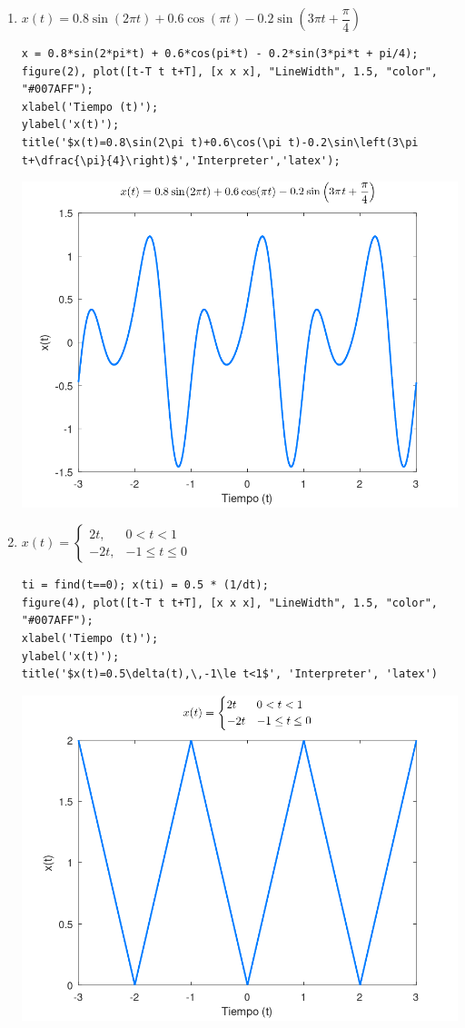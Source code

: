 \documentclass{article}
\begin{document}
\begin{enumerate}[leftmargin=*]
\begin{enumerate}[label=\alph*)]
\item $x(t)=0.8\sin(2\pi t)+0.6\cos(\pi t)-0.2\sin\left(3\pi t+\dfrac{\pi}{4}\right)$
\begin{lstlisting}
x = 0.8*sin(2*pi*t) + 0.6*cos(pi*t) - 0.2*sin(3*pi*t + pi/4);
figure(2), plot([t-T t t+T], [x x x], "LineWidth", 1.5, "color", "#007AFF");
xlabel('Tiempo (t)');
ylabel('x(t)');
title('$x(t)=0.8\sin(2\pi t)+0.6\cos(\pi t)-0.2\sin\left(3\pi t+\dfrac{\pi}{4}\right)$','Interpreter','latex');
\end{lstlisting}
\begin{center}
\includegraphics[width=0.7\linewidth]{Imágenes/Figura2}
\end{center}
\item $x(t)=\begin{cases}
2t, & 0<t<1\\
-2t,&-1\le t\le0
\end{cases}$
\begin{lstlisting}
ti = find(t==0); x(ti) = 0.5 * (1/dt);
figure(4), plot([t-T t t+T], [x x x], "LineWidth", 1.5, "color", "#007AFF");
xlabel('Tiempo (t)');
ylabel('x(t)');
title('$x(t)=0.5\delta(t),\,-1\le t<1$', 'Interpreter', 'latex')
\end{lstlisting}
\begin{center}
\includegraphics[width=0.7\linewidth]{Imágenes/Figura3}

\end{center}
\end{enumerate}
\end{enumerate}
\end{document}

